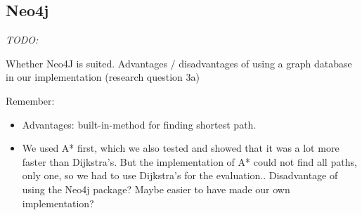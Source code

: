 \subsection{Neo4j}

\emph{\color{blue} TODO:}

Whether Neo4J is suited. Advantages / disadvantages of using a graph database in our implementation (research question 3a)

Remember:
\begin{itemize}
\item Advantages: built-in-method for finding shortest path.
\item We used A* first, which we also tested and showed that it was a lot more faster than Dijkstra's. But the implementation of A* could not find all paths, only one, so we had to use Dijkstra's for the evaluation.. Disadvantage of using the Neo4j package? Maybe easier to have made our own implementation?
\end{itemize}

